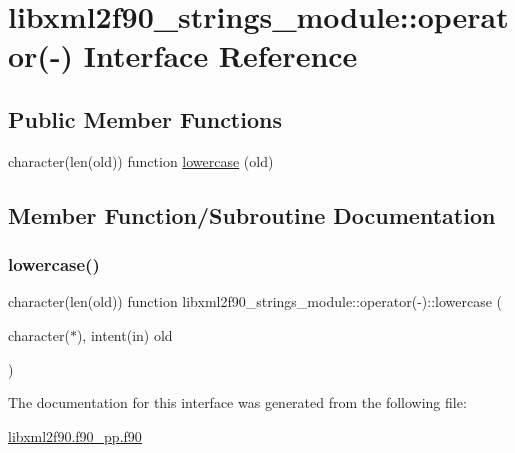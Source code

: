 \hypertarget{interfacelibxml2f90__strings__module_1_1operator_07-_08}{}\section{libxml2f90\+\_\+strings\+\_\+module\+:\+:operator(-\/) Interface Reference}
\label{interfacelibxml2f90__strings__module_1_1operator_07-_08}
\subsection*{Public Member Functions}
\begin{DoxyCompactItemize}
\item 
character(len(old)) function \hyperlink{interfacelibxml2f90__strings__module_1_1operator_07-_08_ac329f36ef2cb0ad129ab731971dd0a86}{lowercase} (old)
\end{DoxyCompactItemize}


\subsection{Member Function/\+Subroutine Documentation}
\mbox{\label{interfacelibxml2f90__strings__module_1_1operator_07-_08_ac329f36ef2cb0ad129ab731971dd0a86}} 
\subsubsection{\texorpdfstring{lowercase()}{lowercase()}}
{\footnotesize\ttfamily character(len(old)) function libxml2f90\+\_\+strings\+\_\+module\+::operator(-\/)\+::lowercase (\begin{DoxyParamCaption}\item[{character($\ast$), intent(in)}]{old }\end{DoxyParamCaption})}



The documentation for this interface was generated from the following file\+:\begin{DoxyCompactItemize}
\item 
\hyperlink{libxml2f90_8f90__pp_8f90}{libxml2f90.\+f90\+\_\+pp.\+f90}\end{DoxyCompactItemize}
